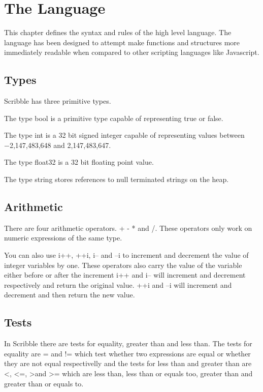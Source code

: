 \documentclass[]{final_report}
\begin{document}
\chapter{The Language}

This chapter defines the syntax and rules of the high level language. The language has been designed to attempt make functions and structures more immediately readable when compared to other scripting languages like Javascript.

\section{Types}

Scribble has three primitive types.

The type bool is a primitive type capable of representing true or false.

The type int is a 32 bit signed integer capable of representing values between  −2,147,483,648 and 2,147,483,647.

The type float32 is a 32 bit floating point value.

The type string stores references to null terminated strings on the heap.

\section{Arithmetic}

There are four arithmetic operators. + - * and /. These operators only work on numeric expressions of the same type.

You can also use i++, ++i, i-- and --i to increment and decrement the value of integer variables by one. These operators also carry the value of the variable either before or after the increment i++ and i-- will increment and decrement respectively and return the original value. ++i and --i will increment and decrement and then return the new value.

\section{Tests}

In Scribble there are tests for equality, greater than and less than. The tests for equality are = and != which test whether two expressions are equal or whether they are not equal respectivelly and the tests for less than and greater than are \textless, \textless=, \textgreater and \vspace{1pt} \textgreater= which are less than, less than or equals too, greater than and greater than or equals to.
\end{document}
